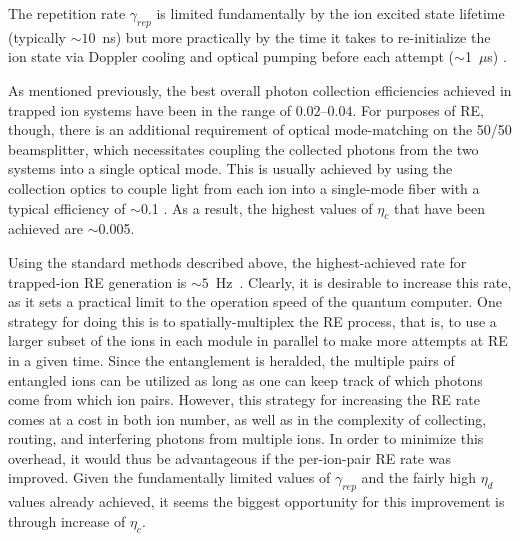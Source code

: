 \documentclass[%
12pt,
 amsmath,amssymb,
]{revtex4-2}
\begin{document}
The repetition rate $\gamma_{rep}$ is limited fundamentally by the ion excited state lifetime (typically ${\sim}10$~ns) but more practically by the time it takes to re-initialize the ion state via Doppler cooling and optical pumping before each attempt ($\sim$1~$\mu$s) \cite{HuculModEntanglement2014}.

As mentioned previously, the best overall photon collection efficiencies achieved in trapped ion systems have been in the range of $0.02$--$0.04$. For purposes of RE, though, there is an additional requirement of optical mode-matching on the 50/50 beamsplitter, which necessitates coupling the collected photons from the two systems into a single optical mode. This is usually achieved by using the collection optics to couple light from each ion into a single-mode fiber with a typical efficiency of $\sim$0.1 \cite{HuculModEntanglement2014}.  As a result, the highest values of $\eta_{c}$ that have been achieved are $\sim$0.005.

Using the standard methods described above, the highest-achieved rate for trapped-ion RE generation is ${\sim}5$~Hz~\cite{HuculModEntanglement2014}.  Clearly, it is desirable to increase this rate, as it sets a practical limit to the operation speed of the quantum computer.  One strategy for doing this is to spatially-multiplex the RE process, that is, to use a larger subset of the ions in each module in parallel to make more attempts at RE in a given time.  Since the entanglement is heralded, the multiple pairs of entangled ions can be utilized as long as one can keep track of which photons come from which ion pairs.  However, this strategy for increasing the RE rate comes at a cost in both ion number, as well as in the complexity of collecting, routing, and interfering photons from multiple ions.  In order to minimize this overhead, it would thus be advantageous if the per-ion-pair RE rate was improved.  Given the fundamentally limited values of $\gamma_{rep}$ and the fairly high $\eta_{d}$ values already achieved,  it seems the biggest opportunity for this improvement is through increase of $\eta_{c}$.
\end{document}
